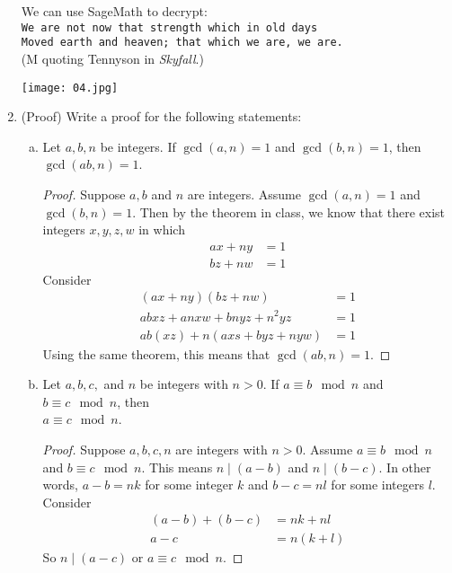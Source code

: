 \documentclass[12pt]{amsart}
\theoremstyle{plain}
\theoremstyle{definition}
\begin{document}
\begin{enumerate}[1.]
	We can use SageMath to decrypt:\\
	
	\noindent \texttt{We are not now that strength which in old days}\\
	\texttt{Moved earth and heaven; that which we are, we are.}\\
	(M quoting Tennyson in \emph{Skyfall}.)\\
	
	\begin{framed}
	\texttt{[image: 04.jpg]}
	\end{framed}
	
	 \item (Proof) Write a proof for the following statements:\\
		\begin{enumerate}[a.]
			\item Let $a,b,n$ be integers.  If $\gcd(a,n) = 1$ and $\gcd(b,n) = 1$, then $\gcd(ab,n) = 1$.\\
				
				\begin{proof}
				Suppose $a,b$ and $n$ are integers.  Assume $\gcd(a,n) = 1$ and $\gcd(b,n) = 1$.  Then by the theorem in class, we know that there exist integers $x,y,z,w$ in which
				\begin{align*}
				ax+ny &= 1\\
				bz+nw &=1
				\end{align*}
				Consider 
				\begin{align*}
				(ax+ny)(bz+nw) &= 1\\
				abxz+anxw+bnyz+n^2yz &= 1\\
				ab(xz) + n(axs+byz+nyw) &=1
				\end{align*}
				Using the same theorem, this means that $\gcd(ab,n) = 1$.
				\end{proof}
				
			\item Let $a,b,c,$ and $n$ be integers with $n > 0$.  If $a \equiv b \mod n$ and  $b \equiv c \mod n$, then\\ $a \equiv c \mod n$.\\
			
				\begin{proof}
				Suppose $a,b,c,n$ are integers with $n > 0$.  Assume $a \equiv b \mod n$ and  $b \equiv c \mod n$.  This means $n \mid (a-b)$ and $n \mid (b-c)$.  In other words, $a-b = nk$ for some integer $k$ and $b-c = nl$ for some integers $l$.
				Consider
				\begin{align*}
				(a-b)+(b-c) &= nk + nl\\
				a-c &= n(k+l)
				\end{align*}
				So $n \mid (a-c)$ or $a \equiv c \mod n$.
				\end{proof}
				

\end{enumerate}
\end{enumerate}
\end{document}
